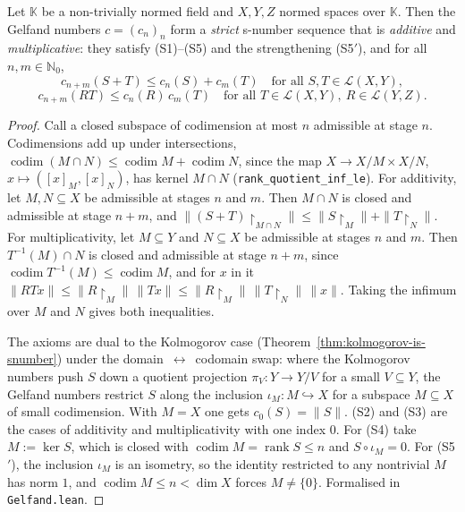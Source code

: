 \begin{theorem}
\label{thm:gelfand-is-snumber}
\leanok
{}
Let $\mathbb{K}$ be a non-trivially normed field and $X, Y, Z$ normed spaces
over $\mathbb{K}$. Then the Gelfand numbers $c = (c_n)_n$ form a
\emph{strict} s-number sequence that is \emph{additive} and
\emph{multiplicative}: they satisfy (S1)--(S5) and the strengthening
(S5$'$), and for all $n, m \in \mathbb{N}_0$,
\[
  c_{n+m}(S + T) \le c_n(S) + c_m(T)
  \quad \text{for all } S, T \in \mathcal{L}(X, Y),
\]
\[
  c_{n+m}(R T) \le c_n(R) \, c_m(T)
  \quad \text{for all } T \in \mathcal{L}(X, Y), \ R \in \mathcal{L}(Y, Z).
\]
\end{theorem}
\begin{proof}
\leanok
Call a closed subspace of codimension at most $n$ admissible at stage $n$.
Codimensions add up under intersections,
$\operatorname{codim}(M \cap N) \le \operatorname{codim} M +
\operatorname{codim} N$, since the map $X \to X/M \times X/N$,
$x \mapsto ([x]_M, [x]_N)$, has kernel $M \cap N$
(\texttt{rank\_quotient\_inf\_le}). For additivity, let $M, N \subseteq X$
be admissible at stages $n$ and $m$. Then $M \cap N$ is closed and
admissible at stage $n + m$, and
$\|(S + T)\restriction_{M \cap N}\| \le \|S \restriction_M\| +
\|T \restriction_N\|$. For multiplicativity, let $M \subseteq Y$ and
$N \subseteq X$ be admissible at stages $n$ and $m$. Then $T^{-1}(M) \cap N$
is closed and admissible at stage $n + m$, since
$\operatorname{codim} T^{-1}(M) \le \operatorname{codim} M$, and for $x$ in
it $\|R T x\| \le \|R \restriction_M\| \, \|T x\| \le
\|R \restriction_M\| \, \|T \restriction_N\| \, \|x\|$. Taking the infimum
over $M$ and $N$ gives both inequalities.

The axioms are dual to the Kolmogorov case
(Theorem~\ref{thm:kolmogorov-is-snumber}) under the
domain~$\leftrightarrow$~codomain swap: where the Kolmogorov numbers push
$S$ down a quotient projection $\pi_V : Y \to Y/V$ for a small
$V \subseteq Y$, the Gelfand numbers restrict $S$ along the inclusion
$\iota_M : M \hookrightarrow X$ for a subspace $M \subseteq X$ of small
codimension. With $M = X$ one gets $c_0(S) = \|S\|$. (S2) and (S3) are the
cases of additivity and multiplicativity with one index $0$. For (S4) take
$M := \ker S$, which is
closed with $\operatorname{codim} M = \operatorname{rank} S \le n$ and
$S \circ \iota_M = 0$. For (S5$'$), the inclusion $\iota_M$ is an isometry,
so the identity restricted to any nontrivial $M$ has norm $1$, and
$\operatorname{codim} M \le n < \dim X$ forces $M \neq \{0\}$. Formalised
in \texttt{Gelfand.lean}.
\end{proof}

